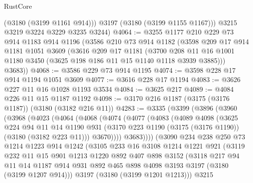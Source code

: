 \begin{lexlean}{RustCore}
\begin{coremodule}
          (@3180 (@3199 @1161 @914)))
        @3197
        (@3180 (@3199 @1155 @1167)))
      @3215
      @3219
      @3224
      @3229
      @3235
      @3244)
@4064 := @3255
    @1177
    @210
    @229
    @73
    @914
    @1183
    @914
    @1196
    (@3586
      @210
      @73
      @914
      @1182
      (@3598
        @209
        @17
        @914
        @1181
        @1051
        @3609
        (@3616
          @209
          @17
          @1181
          (@3700 @208 @11 @16 @1001 @1180 @3450 (@3625 @198 @186 @11 @15 @1140 @1118 @3939 @3885)))
        @3683))
@4068 := @3586 @229 @73 @914 @1195
@4074 := @3598 @228 @17 @914 @1194 @1051 @3609
@4077 := @3616 @228 @17 @1194
@4083 := @3626 @227 @11 @16 @1028 @1193 @3534
@4084 := @3625 @217
@4089 := @4084 @226 @11 @15 @1187 @1192
@4098 := @3170 @216 @1187 (@3175 (@3176 @1187)) (@3180 (@3182 @216 @11))
@4283 := @3335
    (@3399
      (@3896
        (@3960
          (@3968
            (@4023
              (@4064
                (@4068
                  (@4074
                    (@4077
                      (@4083
                        (@4089
                          @4098
                          (@3625
                            @224
                            @94
                            @11
                            @14
                            @1190
                            @931
                            (@3170 @223 @1190 (@3175 (@3176 @1190)) (@3180 (@3182 @223 @11)))
                            @3670))))
                    @3683))))
            (@3090
              @234
              @238
              @250
              @73
              @1214
              @1223
              @914
              @1242
              (@3105
                @233
                @16
                @3108
                @1214
                @1221
                @921
                (@3119
                  @232
                  @11
                  @15
                  @901
                  @1213
                  @1220
                  @892
                  @407
                  @898
                  @3152
                  (@3118
                    @217
                    @94
                    @11
                    @14
                    @1187
                    @914
                    @931
                    @892
                    @465
                    @898
                    @4098
                    @3193
                    @3197
                    (@3180 (@3199 @1207 @914)))
                  @3197
                  (@3180 (@3199 @1201 @1213)))
                @3215

\end{coremodule}
\end{lexlean}
